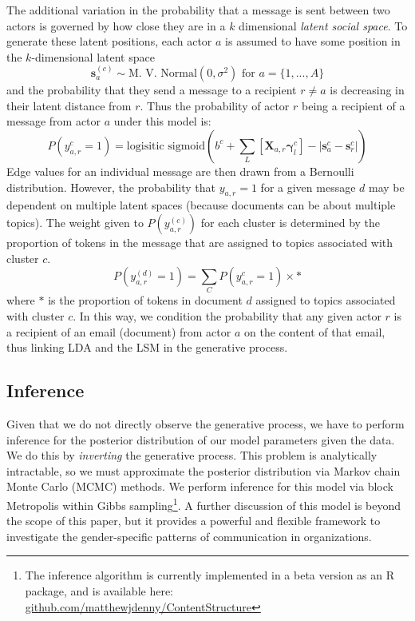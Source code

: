 \documentclass{pnastwo}
\begin{document}
\begin{article}
The additional variation in the probability that a message is sent between two actors is governed by how close they are in a $k$ dimensional \emph{latent social space}. To generate these latent positions, each actor $a$ is assumed to have some position in the $k$-dimensional latent space
\begin{equation}
	\mathbf{s}_a^{(c)} \sim \text{M. V. Normal}(0, \sigma^2) \text{ for } a = \{1, ...,A\}
\end{equation}
and the probability that they send a message to a recipient $r \neq a$ is decreasing in their latent distance from $r$. Thus the probability of actor $r$ being a recipient of a message from actor $a$ under this model is:
\begin{equation}
	P(y_{a,r}^{c} = 1) = \text{logisitic sigmoid}\left( b^c + \sum_L \left[\mathbf{X}_{a,r} \mathbf{\gamma}_l^{c}\right] - |\mathbf{s}_a^{c} - \mathbf{s}_r^{c}| \right)
\end{equation}
Edge values for an individual message are then drawn from a Bernoulli distribution. However, the probability that $y_{a,r} = 1$ for a given message $d$ may be dependent on multiple latent spaces (because documents can be about multiple topics). The weight given to $P(y_{a,r}^{(c)})$ for each cluster is determined by the proportion of tokens in the message that are assigned to topics associated with cluster $c$.  
\begin{equation}
	P(y_{a,r}^{(d)} = 1) = \sum_C P(y_{a,r}^{c} = 1) \times *
\end{equation}
where $*$ is the proportion of tokens in document $d$ assigned to topics associated with cluster $c$. In this way, we condition the probability that any given actor $r$ is a recipient of an email (document) from actor $a$ on the content of that email, thus linking LDA and the LSM in the generative process.

\subsection{Inference}
Given that we do not directly observe the generative process, we have to perform inference for the posterior distribution of our model parameters given the data. We do this by \emph{inverting} the generative process. This problem is analytically intractable, so we must approximate the posterior distribution via Markov chain Monte Carlo (MCMC) methods. We perform inference for this model via block Metropolis within Gibbs sampling\footnote{The inference algorithm is currently implemented in a beta version as an R package, and is available here: \href{https://github.com/matthewjdenny/ContentStructure}{github.com/matthewjdenny/ContentStructure}}. A further discussion of this model is beyond the scope of this paper, but it provides a powerful and flexible framework to investigate the gender-specific patterns of communication in organizations.


\end{article}
\end{document}
